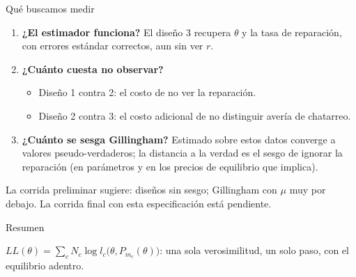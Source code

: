 \documentclass[aspectratio=169,11pt]{beamer}
\newcommand{\idea}[1]{\vspace{-0.3em}\begin{block}{}\centering\small #1\end{block}}
\begin{document}
\begin{frame}{Qué buscamos medir}
  \begin{enumerate}
    \item \textbf{¿El estimador funciona?} El diseño 3 recupera $\theta$ y la tasa de
          reparación, con errores estándar correctos, aun sin ver $r$.
    \item \textbf{¿Cuánto cuesta no observar?}
          \begin{itemize}
            \item Diseño 1 contra 2: el costo de no ver la reparación.
            \item Diseño 2 contra 3: el costo adicional de no distinguir avería de
                  chatarreo.
          \end{itemize}
    \item \textbf{¿Cuánto se sesga Gillingham?} Estimado sobre estos datos converge a
          valores pseudo-verdaderos; la distancia a la verdad es el sesgo de ignorar la
          reparación (en parámetros y en los precios de equilibrio que implica).
  \end{enumerate}
  \idea{La corrida preliminar sugiere: diseños sin sesgo; Gillingham con $\mu$ muy por
  debajo. La corrida final con esta especificación está pendiente.}
\end{frame}

\begin{frame}{Resumen}
  \vspace{0.5em}
  \centering
  \vspace{0.8em}
  \idea{$\displaystyle LL(\theta)=\sum_c N_c\log l_c\big(\theta,P_{m_c}(\theta)\big)$: una
  sola verosimilitud, un solo paso, con el equilibrio adentro.}
\end{frame}
\end{document}
